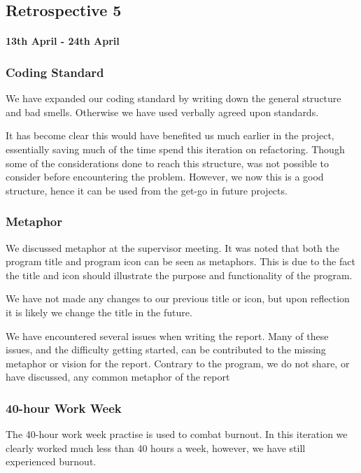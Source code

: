 \subsection*{Retrospective 5}
\paragraph{13th April - 24th April}

\subsubsection{Coding Standard}
We have expanded our coding standard by writing down the general structure and bad smells. Otherwise we have used verbally agreed upon standards.

It has become clear this would have benefited us much earlier in the project, essentially saving much of the time spend this iteration on refactoring. Though some of the considerations done to reach this structure, was not possible to consider before encountering the problem.
However, we now this is a good structure, hence it can be used from the get-go in future projects. 


\subsubsection{Metaphor}
We discussed metaphor at the supervisor meeting. It was noted that both the program title and program icon can be seen as metaphors. This is due to the fact the title and icon should illustrate the purpose and functionality of the program.

We have not made any changes to our previous title or icon, but upon reflection it is likely we change the title in the future.

We have encountered several issues when writing the report. Many of these issues, and the difficulty getting started, can be contributed to the missing metaphor or vision for the report. Contrary to the program, we do not share, or have discussed, any common metaphor of the report

\subsubsection{40-hour Work Week}

The 40-hour work week practise is used to combat burnout.
In this iteration we clearly worked much less than 40 hours a week, however, we have still experienced burnout.

